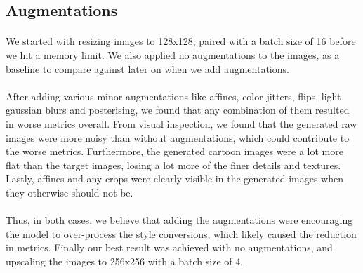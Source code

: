 \documentclass[twoside,english,notitlepage]{report}
\begin{document}
\subsection{Augmentations}
\paragraph{} We started with resizing images to 128x128, paired with a batch size of 16 before we hit a memory limit. We also applied no augmentations to the images, as a baseline to compare against later on when we add augmentations. 

\paragraph{} After adding various minor augmentations like affines, color jitters, flips, light gaussian blurs and posterising, we found that any combination of them resulted in worse metrics overall. From visual inspection, we found that the generated raw images were more noisy than without augmentations, which could contribute to the worse metrics. Furthermore, the generated cartoon images were a lot more flat than the target images, losing a lot more of the finer details and textures. Lastly, affines and any crops were clearly visible in the generated images when they otherwise should not be. 

\paragraph{} Thus, in both cases, we believe that adding the augmentations were encouraging the model to over-process the style conversions, which likely caused the reduction in metrics. Finally our best result was achieved with no augmentations, and upscaling the images to 256x256 with a batch size of 4. 
\end{document}
